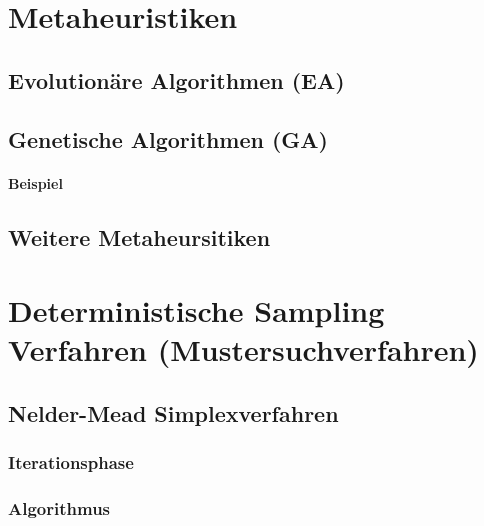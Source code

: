     \section{Metaheuristiken} %

        \subsection{Evolutionäre Algorithmen (EA)} %

        \subsection{Genetische Algorithmen (GA)} %

            \paragraph{Beispiel} %

        \subsection{Weitere Metaheursitiken} %

    \section{Deterministische Sampling Verfahren (Mustersuchverfahren)} %

        \subsection{Nelder-Mead Simplexverfahren} %

            \subsubsection{Iterationsphase} %

            \subsubsection{Algorithmus} %

